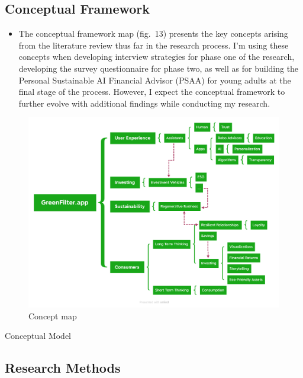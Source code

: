 \documentclass[
  letterpaper,
  DIV=11,
  numbers=noendperiod]{scrartcl}
\providecommand{\tightlist}{%
  \setlength{\itemsep}{0pt}\setlength{\parskip}{0pt}}\usepackage{longtable,booktabs,array}
\begin{document}
\subsection{Conceptual Framework}\label{conceptual-framework}

\begin{itemize}
\tightlist
\item
  The conceptual framework map (fig.~13) presents the key concepts
  arising from the literature review thus far in the research process.
  I'm using these concepts when developing interview strategies for
  phase one of the research, developing the survey questionnaire for
  phase two, as well as for building the Personal Sustainable AI
  Financial Advisor (PSAA) for young adults at the final stage of the
  process. However, I expect the conceptual framework to further evolve
  with additional findings while conducting my research.
\end{itemize}

\begin{figure}[H]

{\centering \includegraphics[width=1\linewidth,height=\textheight,keepaspectratio]{./images/methodology/concept-map.png}

}

\caption{Concept map}

\end{figure}%

Conceptual Model

\subsection{Research Methods}\label{research-methods}
\end{document}
